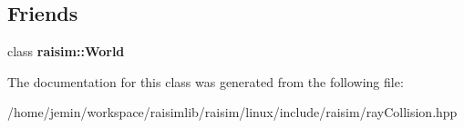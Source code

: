 \subsection*{Friends}
\begin{DoxyCompactItemize}
\item 
\mbox{\label{classraisim_1_1RayCollisionList_a75377ff6a84c306b270e189091d3efed}} 
class {\bfseries raisim\+::\+World}
\end{DoxyCompactItemize}


The documentation for this class was generated from the following file\+:\begin{DoxyCompactItemize}
\item 
/home/jemin/workspace/raisimlib/raisim/linux/include/raisim/ray\+Collision.\+hpp\end{DoxyCompactItemize}
